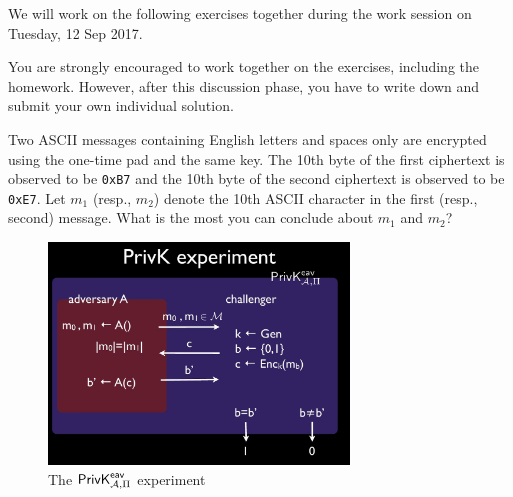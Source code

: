 \documentclass[a4paper,10pt,landscape,twocolumn]{scrartcl}
\begin{document}
\problems

{\sffamily\noindent
We will work on the following exercises together during the work session on Tuesday, 12 Sep 2017.

You are strongly encouraged to work together on the exercises, including the homework. However, after this discussion phase, you have to write down and submit your own individual solution. }


\begin{exercise}
Two ASCII messages containing English letters and spaces only are encrypted using the one-time pad and the same key. The 10th byte of the first ciphertext is observed to be \texttt{0xB7} and the 10th byte of the second ciphertext is observed to be \texttt{0xE7}. Let $m_1$ (resp., $m_2$) denote the 10th ASCII character in the first (resp., second) message. What is the most you can conclude about $m_1$ and $m_2$?
\end{exercise}

\begin{figure}[h]
\center
\includegraphics[width=8cm]{PrivKexperiment.jpg}
\caption{The $\mathsf{PrivK}^{\mathsf{eav}}_{\mathcal{A},\Pi}$ experiment \label{fig}}
\end{figure}
\end{document}
